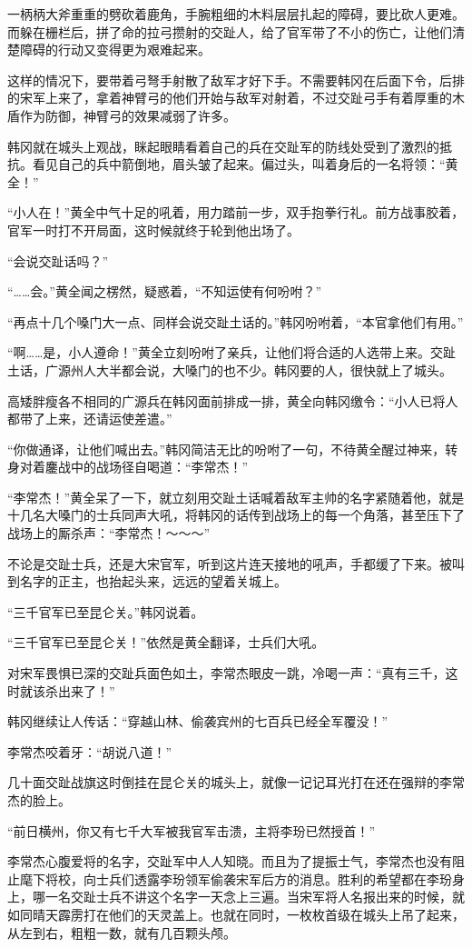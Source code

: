 一柄柄大斧重重的劈砍着鹿角，手腕粗细的木料层层扎起的障碍，要比砍人更难。而躲在栅栏后，拼了命的拉弓攒射的交趾人，给了官军带了不小的伤亡，让他们清楚障碍的行动又变得更为艰难起来。

这样的情况下，要带着弓弩手射散了敌军才好下手。不需要韩冈在后面下令，后排的宋军上来了，拿着神臂弓的他们开始与敌军对射着，不过交趾弓手有着厚重的木盾作为防御，神臂弓的效果减弱了许多。

韩冈就在城头上观战，眯起眼睛看着自己的兵在交趾军的防线处受到了激烈的抵抗。看见自己的兵中箭倒地，眉头皱了起来。偏过头，叫着身后的一名将领：“黄全！”

“小人在！”黄全中气十足的吼着，用力踏前一步，双手抱拳行礼。前方战事胶着，官军一时打不开局面，这时候就终于轮到他出场了。

“会说交趾话吗？”

“……会。”黄全闻之楞然，疑惑着，“不知运使有何吩咐？”

“再点十几个嗓门大一点、同样会说交趾土话的。”韩冈吩咐着，“本官拿他们有用。”

“啊……是，小人遵命！”黄全立刻吩咐了亲兵，让他们将合适的人选带上来。交趾土话，广源州人大半都会说，大嗓门的也不少。韩冈要的人，很快就上了城头。

高矮胖瘦各不相同的广源兵在韩冈面前排成一排，黄全向韩冈缴令：“小人已将人都带了上来，还请运使差遣。”

“你做通译，让他们喊出去。”韩冈简洁无比的吩咐了一句，不待黄全醒过神来，转身对着鏖战中的战场径自喝道：“李常杰！”

“李常杰！”黄全呆了一下，就立刻用交趾土话喊着敌军主帅的名字紧随着他，就是十几名大嗓门的士兵同声大吼，将韩冈的话传到战场上的每一个角落，甚至压下了战场上的厮杀声：“李常杰！～～～”

不论是交趾士兵，还是大宋官军，听到这片连天接地的吼声，手都缓了下来。被叫到名字的正主，也抬起头来，远远的望着关城上。

“三千官军已至昆仑关。”韩冈说着。

“三千官军已至昆仑关！”依然是黄全翻译，士兵们大吼。

对宋军畏惧已深的交趾兵面色如土，李常杰眼皮一跳，冷喝一声：“真有三千，这时就该杀出来了！”

韩冈继续让人传话：“穿越山林、偷袭宾州的七百兵已经全军覆没！”

李常杰咬着牙：“胡说八道！”

几十面交趾战旗这时倒挂在昆仑关的城头上，就像一记记耳光打在还在强辩的李常杰的脸上。

“前日横州，你又有七千大军被我官军击溃，主将李玢已然授首！”

李常杰心腹爱将的名字，交趾军中人人知晓。而且为了提振士气，李常杰也没有阻止麾下将校，向士兵们透露李玢领军偷袭宋军后方的消息。胜利的希望都在李玢身上，哪一名交趾士兵不讲这个名字一天念上三遍。当宋军将人名报出来的时候，就如同晴天霹雳打在他们的天灵盖上。也就在同时，一枚枚首级在城头上吊了起来，从左到右，粗粗一数，就有几百颗头颅。


